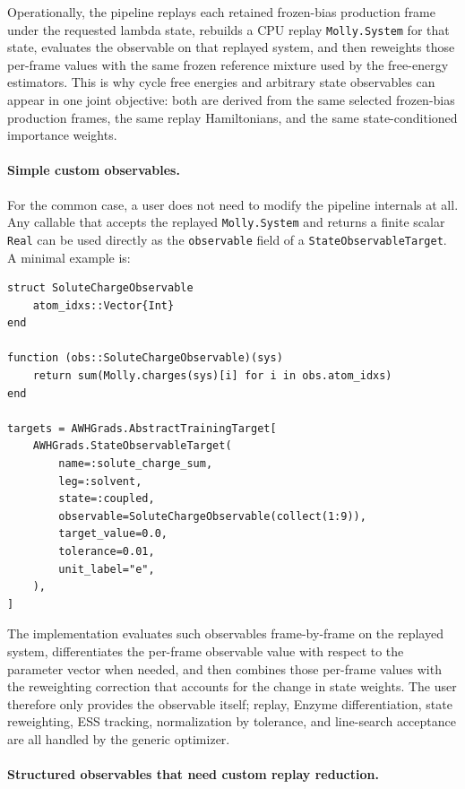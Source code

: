 Operationally, the pipeline replays each retained frozen-bias production frame
under the requested lambda state, rebuilds a CPU replay \texttt{Molly.System}
for that state, evaluates the observable on that replayed system, and then
reweights those per-frame values with the same frozen reference mixture used by
the free-energy estimators. This is why cycle free energies and arbitrary state
observables can appear in one joint objective: both are derived from the same
selected frozen-bias production frames, the same replay Hamiltonians, and the
same state-conditioned importance weights.

\paragraph{Simple custom observables.}

For the common case, a user does not need to modify the pipeline internals at
all. Any callable that accepts the replayed \texttt{Molly.System} and returns a
finite scalar \texttt{Real} can be used directly as the \texttt{observable}
field of a \texttt{StateObservableTarget}. A minimal example is:

\begin{verbatim}
struct SoluteChargeObservable
    atom_idxs::Vector{Int}
end

function (obs::SoluteChargeObservable)(sys)
    return sum(Molly.charges(sys)[i] for i in obs.atom_idxs)
end

targets = AWHGrads.AbstractTrainingTarget[
    AWHGrads.StateObservableTarget(
        name=:solute_charge_sum,
        leg=:solvent,
        state=:coupled,
        observable=SoluteChargeObservable(collect(1:9)),
        target_value=0.0,
        tolerance=0.01,
        unit_label="e",
    ),
]
\end{verbatim}

The implementation evaluates such observables frame-by-frame on the replayed
system, differentiates the per-frame observable value with respect to the
parameter vector when needed, and then combines those per-frame values with the
reweighting correction that accounts for the change in state weights. The user
therefore only provides the observable itself; replay, Enzyme differentiation,
state reweighting, ESS tracking, normalization by tolerance, and line-search
acceptance are all handled by the generic optimizer.

\paragraph{Structured observables that need custom replay reduction.}

